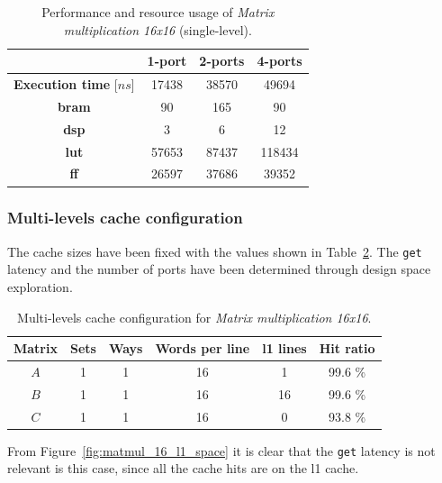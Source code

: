 \documentclass[11pt,a4paper,oneside]{memoir}
\begin{document}
\begin{table}[H]
	\begin{center}
		\begin{tabular}{cccc}
			\hline
			\rowcolor{gray!50}
			& \textbf{1-port} & \textbf{2-ports} & \textbf{4-ports} \\
			\hline
			\textbf{Execution time} [$ns$] & 17438 & 38570 & 49694 \\
			\rowcolor{gray!25}
			\textbf{\ac{bram}} & 90 & 165 & 90 \\
			\textbf{\acs{dsp}} & 3 & 6 & 12 \\
			\rowcolor{gray!25}
			\textbf{\acs{lut}} & 57653 & 87437 & 118434 \\
			\textbf{\acs{ff}} & 26597 & 37686 & 39352 \\
			\hline
		\end{tabular}
	\end{center}
	\caption{Performance and resource usage of \emph{Matrix multiplication
	16x16} (single-level).}
	\label{tab:matmul_16_no_l1_ports_report}
\end{table}

\subsubsection{Multi-levels cache configuration}
The cache sizes have been fixed with the values shown in
Table~\ref{tab:matmul_16_l1_config}.
The \texttt{get} latency and the number of ports have been determined through
design space exploration.

\begin{table}[H]
	\begin{center}
		\begin{tabular}{cccccc}
			\hline
			\rowcolor{gray!50}
			\textbf{Matrix} &
			\textbf{Sets} & \textbf{Ways} & \textbf{Words per line} &
			\textbf{\ac{l1} lines} & \textbf{Hit ratio} \\
			\hline
			$A$ & 1 & 1 & 16 & 1 & 99.6 \% \\
			\rowcolor{gray!25}
			$B$ & 1 & 1 & 16 & 16 & 99.6 \% \\
			$C$ & 1 & 1 & 16 & 0 & 93.8 \% \\
			\hline
		\end{tabular}
	\end{center}
	\caption{Multi-levels cache configuration for \emph{Matrix
	multiplication 16x16}.}
	\label{tab:matmul_16_l1_config}
\end{table}

From Figure~\ref{fig:matmul_16_l1_space} it is clear that the \texttt{get}
latency is not relevant is this case, since all the cache hits are on the
\ac{l1} cache.
\end{document}
